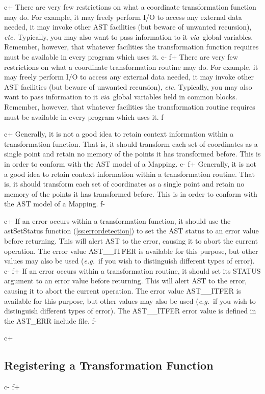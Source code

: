 \documentclass[twoside,11pt]{article}
\newcommand{\secref}[1]{\S\ref{#1}}
\renewcommand{\secref}[1]{\ref{#1}}
\begin{document}
c+
There are very few restrictions on what a coordinate transformation
function may do. For example, it may freely perform I/O to access any
external data needed, it may invoke other AST facilities (but beware
of unwanted recursion), {\em{etc.}} Typically, you may also want to
pass information to it {\em{via}}\ global variables. Remember,
however, that whatever facilities the transformation function requires
must be available in every program which uses it.
c-
f+
There are very few restrictions on what a coordinate transformation
routine may do. For example, it may freely perform I/O to access any
external data needed, it may invoke other AST facilities (but beware
of unwanted recursion), {\em{etc.}} Typically, you may also want to
pass information to it {\em{via}}\ global variables held in common
blocks.  Remember, however, that whatever facilities the
transformation routine requires must be available in every program
which uses it.
f-

c+
Generally, it is not a good idea to retain context information within
a transformation function. That is, it should transform each set of
coordinates as a single point and retain no memory of the points it
has transformed before. This is in order to conform with the AST model
of a Mapping.
c-
f+
Generally, it is not a good idea to retain context information within
a transformation routine. That is, it should transform each set of
coordinates as a single point and retain no memory of the points it
has transformed before. This is in order to conform with the AST model
of a Mapping.
f-

c+
If an error occurs within a transformation function, it should use the
astSetStatus function (\secref{ss:errordetection}) to set the AST
status to an error value before returning. This will alert AST to the
error, causing it to abort the current operation. The error value
AST\_\_ITFER is available for this purpose, but other values may also
be used ({\em{e.g.}}\ if you wish to distinguish different types of
error).
c-
f+
If an error occurs within a transformation routine, it should set its
STATUS argument to an error value before returning. This will alert
AST to the error, causing it to abort the current operation. The error
value AST\_\_ITFER is available for this purpose, but other values may
also be used ({\em{e.g.}}\ if you wish to distinguish different types
of error). The AST\_\_ITFER error value is defined in the AST\_ERR
include file.
f-

c+
\subsection{\label{ss:registeringintramaps}Registering a Transformation Function}
c-
f+
\end{document}
